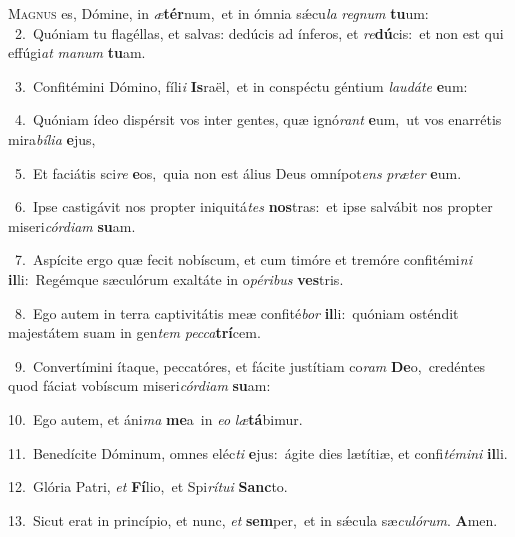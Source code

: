 \lettrine{\initial\textcolor{\initialcolor}{M}}{agnus} es, Dómine, in \textit{æ}\-\textbf{tér}num,~\star et in ómnia sǽcu\textit{la} \textit{re}\-\textit{gnum} \textbf{tu}\-um:\\
{\numbfont\textcolor{\numbcolor}{~2.}}~Quóniam tu flagéllas, et salvas: dedúcis ad ínferos, et \textit{re}\-\textbf{dú}cis:~\star et non est qui effúgi\textit{at} \textit{ma}\-\textit{num} \textbf{tu}\-am.\par
{\numbfont\textcolor{\numbcolor}{~3.}}~Confitémini Dómino, fíli\textit{i} \textbf{Is}\-raël,~\star et in conspéctu géntium \textit{lau}\-\textit{dá}\textit{te} \textbf{e}\-um:\par
{\numbfont\textcolor{\numbcolor}{~4.}}~Quóniam ídeo dispérsit vos inter gentes, quæ ignó\textit{rant} \textbf{e}\-um,~\star ut vos enarrétis mira\-\textit{bí}\-\textit{li}\textit{a} \textbf{e}\-jus,\par
{\numbfont\textcolor{\numbcolor}{~5.}}~Et faciátis sci\textit{re} \textbf{e}\-os,~\star quia non est álius Deus omnípot\textit{ens} \textit{præ}\-\textit{ter} \textbf{e}\-um.\par
{\numbfont\textcolor{\numbcolor}{~6.}}~Ipse castigávit nos propter iniquitá\textit{tes} \textbf{nos}\-tras:~\star et ipse salvábit nos propter miseri\-\textit{cór}\-\textit{di}\textit{am} \textbf{su}\-am.\par
{\numbfont\textcolor{\numbcolor}{~7.}}~Aspícite ergo quæ fecit nobíscum, et cum timóre et tremóre confitémi\textit{ni} \textbf{il}\-li:~\star Regémque sæculórum exaltáte in o\-\textit{pé}\-\textit{ri}\textit{bus} \textbf{ves}\-tris.\par
{\numbfont\textcolor{\numbcolor}{~8.}}~Ego autem in terra captivitátis meæ confité\textit{bor} \textbf{il}\-li:~\star quóniam osténdit majestátem suam in gen\textit{tem} \textit{pec}\-\textit{ca}\textbf{trí}cem.\par
{\numbfont\textcolor{\numbcolor}{~9.}}~Convertímini ítaque, peccatóres, et fácite justítiam co\textit{ram} \textbf{De}\-o,~\star credéntes quod fáciat vobíscum miseri\-\textit{cór}\-\textit{di}\textit{am} \textbf{su}\-am:\par
{\numbfont\textcolor{\numbcolor}{10.}}~Ego autem, et áni\textit{ma} \textbf{me}\-a~\star in \textit{e}\-\textit{o} \textit{læ}\-\textbf{tá}bimur.\par
{\numbfont\textcolor{\numbcolor}{11.}}~Benedícite Dóminum, omnes eléc\textit{ti} \textbf{e}\-jus:~\star ágite dies lætítiæ, et confi\-\textit{té}\-\textit{mi}\textit{ni} \textbf{il}\-li.\par
{\numbfont\textcolor{\numbcolor}{12.}}~Glória Patri, \textit{et} \textbf{Fí}\-lio,~\star et Spi\-\textit{rí}\-\textit{tu}\textit{i} \textbf{Sanc}\-to.\par
{\numbfont\textcolor{\numbcolor}{13.}}~Sicut erat in princípio, et nunc, \textit{et} \textbf{sem}\-per,~\star et in sǽcula sæ\-\textit{cu}\-\textit{ló}\textit{rum}. \textbf{A}\-men.\par
